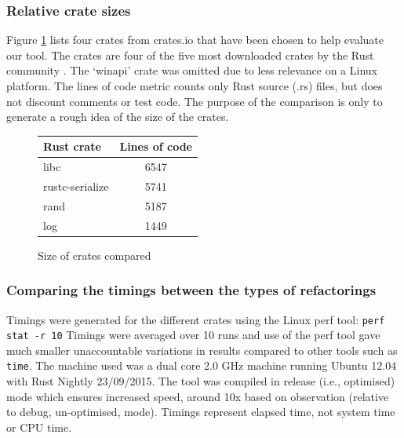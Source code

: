 \subsubsection{Relative crate sizes}
Figure \ref{Fig:codesize} lists  four crates from crates.io that have been chosen to help evaluate our tool. The crates are four of the five most downloaded crates by the Rust community \cite{cratesio15}. The `winapi' crate was omitted due to less relevance on a Linux platform. The lines of code metric counts only Rust source (.rs) files, but does not discount comments or test code. The purpose of the comparison is only to generate a rough idea of the size of the crates.

\begin{figure}[h]
\begin{center}
    \begin{tabular}{ | l | c |}
    \hline
    \textbf{Rust crate} & \textbf{Lines of code} \\ \hline
    libc & 6547 \\ \hline
    rustc-serialize &  5741 \\ \hline
    rand &   5187 \\ \hline
    log &  1449 \\ \hline
    \end{tabular}
\end{center}

\caption{Size of crates compared}
\label{Fig:codesize}
\end{figure}

\subsubsection{Comparing the timings between the types of refactorings}
Timings were generated for the different crates using the Linux perf tool: {\verb|perf stat -r 10|} Timings were averaged over 10 runs and use of the perf tool gave much smaller unaccountable variations in results compared to other tools such as {\verb|time|}. The machine used was a dual core 2.0 GHz machine running Ubuntu 12.04 with Rust Nightly 23/09/2015. The tool was compiled in release (i.e., optimised) mode which ensures increased speed, around 10x based on observation (relative to debug, un-optimised, mode). Timings represent elapsed time, not system time or CPU time.

